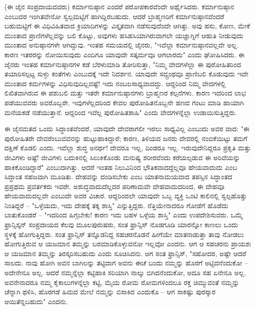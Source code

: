(ಈ ಜೈನ ಸಂಪ್ರದಾಯದವರು) ಕರ್ಮಾನುಷ್ಠಾನ ಎಂದರೆ ಪರೋಪಕಾರವೆಂದೇ ಅರ್ಥೈಸಿದರು. ಕರ್ಮಾನುಷ್ಠಾನ ಎಂಬುದರ ಇಂಗಿತವೇನೋ ಸ್ವಲ್ಪಮಟ್ಟಿಗೆ ಹಾಗಿದ್ದಿರಬಹುದು. ಆದರೆ ಬ್ರಾಹ್ಮಣರಿಗೆ ಕರ್ಮಾನುಷ್ಠಾನವೆಂದರೆ ಬಹುಮಟ್ಟಿಗೆ ಈ ವಿಧಿವಿಹಿತವಾದ ಕ್ರಿಯಾದಿಗಳನ್ನು ವಿಸ್ತೃತವಾಗಿ ನಡೆಸುವುದೆಂದೇ ಆಗಿತ್ತು. ಅವು ಹಸು, ಕೋಣ, ಮೇಕೆ ಮುಂತಾದ ಪ್ರಾಣಿಗಳೆಲ್ಲವನ್ನು ಬಲಿ ಕೊಟ್ಟು, ಅವುಗಳು ಹಸಿಹಸಿಯಾಗಿರುವಾಗಲೇ ಯಜ್ಞಾಗ್ನಿಗೆ ಆಹುತಿ ನೀಡುವುದು ಮುಂತಾದ ಅನುಷ್ಠಾನಗಳೇ ಆಗಿದ್ದುವು. ಇಂತಹ ಸಮಯದಲ್ಲಿ ಜೈನರು, "ಇವೆಲ್ಲಾ ಕರ್ಮಾನುಷ್ಠಾನವಲ್ಲವೇ ಅಲ್ಲ. ಕಾರಣ ಇತರರನ್ನು ನೋಯಿಸುವುದು ಎಂದಿಗೂ ಯಾವುದೇ ಸತ್ಕರ್ಮವೂ ಆಗಲಾರದು" ಎಂದು ಘೋಷಿಸಿದರು. ಈ ಜೈನರು ಇಂತಹ ಕರ್ಮಾನುಷ್ಠಾನಗಳ ಕಡೆ ಬೆರಳುಮಾಡಿ ತೋರಿಸುತ್ತಾ, "ನಿಮ್ಮ ವೇದಗಳೆಲ್ಲಾ ಈ ಪುರೋಹಿತರಿಂದ ತಯಾರಿಸಲ್ಪಟ್ಟ ಸುಳ್ಳು ಕಂತೆಗಳು ಎಂಬುದಕ್ಕೆ ಇದೇ ನಿದರ್ಶನ. ಯಾವುದೇ ಸದ್ಗ್ರಂಥವೂ ಪ್ರಾಣಿಬಲಿ ಕೊಡುವುದು ಇವೇ ಮುಂತಾದ ಕರ್ಮಗಳನ್ನು ವಿಧಿಸುವುದಿಲ್ಲವಷ್ಟೆ! ಇದು ನಂಬಲಸಾಧ್ಯವಾದದ್ದು. ಆದ್ದರಿಂದ ನಿಮ್ಮ ವೇದಗಳಲ್ಲಿ ಲಿಖಿತವಾಗಿರುವ ಈ ಪಶುಬಲಿ ಮತ್ತು ಇತರೇ ಕರ್ಮಾನುಷ್ಠಾನಗಳು ಬ್ರಾಹ್ಮಣರ ಕಲ್ಪನೆಗಳು. ಕಾರಣ ಇದರಿಂದ ಲಾಭ ಪಡೆಯುವವರು ಅವರೊಬ್ಬರೇ. ಇವುಗಳೆಲ್ಲದರಿಂದ ಕೇವಲ ಪುರೋಹಿತನೊಬ್ಬನೇ ಹಣದ ಗಂಟು ಮಾಡಿ ಹಾಯಾಗಿ ಮನೆಯಕಡೆ ನಡೆಯುತ್ತಾನೆ. ಆದ್ದರಿಂದ ಇವೆಲ್ಲ ಪುರೋಹಿತಶಾಹಿ" ಎಂದು ವೇದಗಳನ್ನೆಲ್ಲಾ ಉಡಾಯಿಸುತ್ತಿದ್ದರು.

ಈ ಜೈನಮತದ ಒಂದು ಸಿದ್ಧಾಂತವೆಂದರೆ, ಯಾವುದೇ ದೇವರಾಗಲೀ ಇರಲು ಸಾಧ್ಯವಿಲ್ಲ ಎಂಬುದು ಅವರ ವಾದ: "ಈ ಪುರೋಹಿತರೇ ದೇವರೆಂಬುವವನನ್ನು ಹುಟ್ಟುಹಾಕಿದ್ದಾರೆ; ಕಾರಣ, ತಿಳಿಯದ ಜನರು ದೇವರಲ್ಲಿ ನಂಬಿಕೆಯಿಟ್ಟು ತಮಗೆ ದಕ್ಷಿಣೆ ಕೊಡಲಿ ಎಂದು. ಇವೆಲ್ಲಾ ಶುದ್ಧ ಅನರ್ಥ! ದೇವರೂ ಇಲ್ಲ, ದಿಂಡರೂ ಇಲ್ಲ. ಇರುವುದೇನಿದ್ದರೂ ಪ್ರಕೃತಿ ಮತ್ತು ಜೀವಿಗಳು ಅಷ್ಟೆ! ಜೀವಿಗಳು ಬದುಕಿನಲ್ಲಿ ಸಿಲುಕಿಕೊಂಡು ಮನುಷ್ಯ ಶರೀರವೆಂದು ಕರೆಯಲ್ಪಡುವ ಈ ಅರಿವೆಯನ್ನು ಹಾಕಿಕೊಂಡಿದ್ದಾರೆ" ಎಂಬುದಾಗಿತ್ತು. ಆದರೆ ಇಂತಹ ನಿಲುವಿನಿಂದ ಭೌತಿಕವಾದದ್ದೆಲ್ಲವೂ ಹೇಯವಾದುದು ಎಂಬ ಸಿದ್ಧಾಂತ ಸಹಜವಾಗಿ ಮೂಡಿತು. ದೇಹವನ್ನು ದಂಡಿಸಬೇಕು ಎಂಬ ಯಾತನಾಮಯವಾದ ತಪಸ್ಸಿನ ಸಿದ್ಧಾಂತದ ಪ್ರಪ್ರಥಮ ಪ್ರವರ್ತಕರು ಇವರೇ. ಅಶುದ್ಧವಾದುದೆಲ್ಲದರ ಪರಿಣಾಮವೇ ದೇಹವಾದುದರಿಂದ, ಈ ದೇಹವೂ ಹೇಯವಾದುದಲ್ಲವೇ ಎಂಬುದೇ ಅವರ ವಿಚಾರ. ಆದ್ದರಿಂದಲೇ ಯಾವುದೇ ಒಬ್ಬ ವ್ಯಕ್ತಿ ಒಂಟಿ ಕಾಲಿನಲ್ಲಿ ಸ್ವಲ್ಪಹೊತ್ತು ನಿಂತಿದ್ದರೆ – "ಒಳ್ಳೆಯದು, ಇದು ದೇಹಕ್ಕೆ ತಕ್ಕ ಶಾಸ್ತಿ" ಎನ್ನುತ್ತಿದ್ದರು. ನೆತ್ತಿಯೇನಾದರೂ ಗೋಡೆಗೆ ಹೊಡೆದು ಬಾತುಕೊಂಡರೆ – "ಇದರಿಂದ ಹಿಗ್ಗಬೇಕು! ಕಾರಣ ಇದು ಬಹಳ ಒಳ್ಳೆಯ ಶಾಸ್ತಿ" ಎಂದು ಉಪದೇಶಿಸುವರು. ಒಮ್ಮೆ ಫ್ರಾನ್ಸಿಸ್ಕನ್ ಸಂಪ್ರದಾಯದ ಕೆಲವು ಮೂಲಪುರುಷರು, ಸಂತ ಫ್ರಾನ್ಸಿಸ್ ನೊಡಗೂಡಿ ಯಾರನ್ನೋ ಕಾಣಲು ಒಂದು ಸ್ಥಳಕ್ಕೆ ಹೋಗುತ್ತಿದ್ದರು. ಸಂತ ಫ್ರಾನ್ಸಿಸ್ ತನ್ನೊಡನಿದ್ದ ಸಹಚರನೊಡನೆ ಹೀಗೆಯೇ ಮಾತನಾಡುತ್ತಾ ತಾವು ನೋಡಲು ಹೋಗುತ್ತಿರುವ ಆ ಯಜಮಾನ ತಮ್ಮನ್ನು ಬರಮಾಡಿಕೊಳ್ಳುವನೋ ಇಲ್ಲವೋ ಎಂದನು. ಆಗ ಆ ಸಹಚರನು ಪ್ರಾಯಶಃ ಆ ಯಜಮಾನ ತಮ್ಮನ್ನು ತಿರಸ್ಕರಿಸಬಹುದು ಎಂದು ಸೂಚಿಸಿದನು. ಆಗ ಸಂತ ಫ್ರಾನ್ಸಿಸ್, "ಸಹೋದರ, ಅಷ್ಟೇ ಆದರೆ ಸಾಲದು. ನಾವು ಹೋಗಿ ಅವನ ಬಾಗಿಲನ್ನು ತಟ್ಟಿದಾಗ ಅವನು ಈಚೆ ಬಂದು ನಮ್ಮನ್ನು ಹೊರಗೆ ಅಟ್ಟಿದನೆಂದುಕೋ – ಅದೇನೇನೂ ಅಲ್ಲ. ಆದರೆ ನಮ್ಮನ್ನೆಲ್ಲಾ ಕಟ್ಟಿಹಾಕಿ ಸರಿಯಾಗಿ ನಾಲ್ಕು ಬಿಗಿದನೆಂದುಕೋ, ಅದೂ ಸಹ ಏನೇನೂ ಅಲ್ಲ. ಅವನೇನಾದರೂ ನಮ್ಮ ಕೈಕಾಲುಗಳನ್ನೆಲ್ಲಾ ಕಟ್ಟಿ, ಮೈಯ ರೋಮ ರೋಮಗಳಿಂದಲೂ ರಕ್ತ ಚಿಮ್ಮುವಂತೆ ನಮ್ಮನ್ನು ಚೆನ್ನಾಗಿ ಥಳಿಸಿ, ಹೊರಗಡೆ ಹಿಮದ ಮೇಲೆ ನಮ್ಮನ್ನು ಬಿಸಾಕಿದ ಎಂದುಕೊ – ಆಗ ಸಾಕಷ್ಟು ಪುರಸ್ಕಾರ ಆಯಿತೆನ್ನಬಹುದು" ಎಂದನು.


